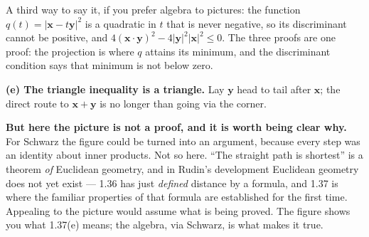 \begin{deeper}
\smallskip
A third way to say it, if you prefer algebra to pictures: the function
$q(t) = |\mathbf{x}-t\mathbf{y}|^2$ is a quadratic in $t$ that is never
negative, so its discriminant cannot be positive, and
$4(\mathbf{x}\cdot\mathbf{y})^2 - 4|\mathbf{y}|^2|\mathbf{x}|^2 \le 0$. The
three proofs are one proof: the projection is where $q$ attains its minimum,
and the discriminant condition says that minimum is not below zero.

\medskip
\textbf{(e) The triangle inequality is a triangle.} Lay $\mathbf{y}$ head to
tail after $\mathbf{x}$; the direct route to $\mathbf{x}+\mathbf{y}$ is no
longer than going via the corner.

\medskip
\begin{center}
\end{center}

\smallskip
\textbf{But here the picture is not a proof, and it is worth being clear why.}
For Schwarz the figure could be turned into an argument, because every step
was an identity about inner products. Not so here. ``The straight path is
shortest'' is a theorem \emph{of} Euclidean geometry, and in Rudin's
development Euclidean geometry does not yet exist --- 1.36 has just
\emph{defined} distance by a formula, and 1.37 is where the familiar
properties of that formula are established for the first time. Appealing to
the picture would assume what is being proved. The figure shows you what
1.37(e) means; the algebra, via Schwarz, is what makes it true.
\end{deeper}

